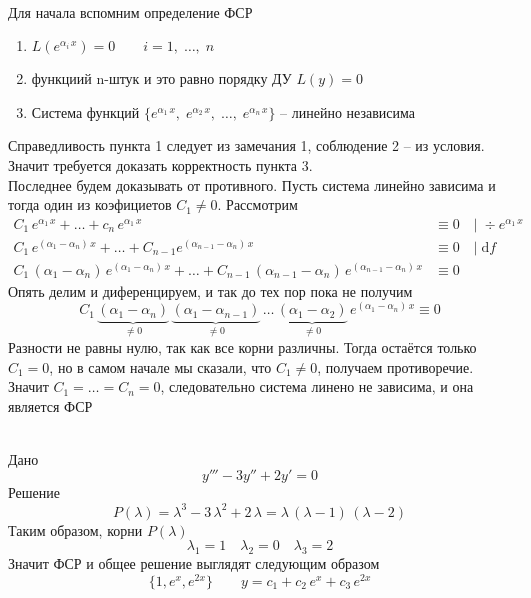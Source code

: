 \begin{Proof}~\\
    Для начала вспомним определение ФСР
    \begin{enumerate}
        \item $L(e^{\alpha_i\,x})=0 \qquad i=1,\; \dots,\; n$
        
        \item функциий n-штук и это равно порядку ДУ $L(y)=0$
        
        \item Система функций $\{e^{\alpha_1\,x},\; e^{\alpha_2\,x},\; \dots,\; e^{\alpha_n\,x}\}$ -- линейно независима
    \end{enumerate}
    
    Справедливость пункта 1 следует из замечания 1, соблюдение 2 -- из условия. Значит требуется доказать корректность пункта 3. \\
    
    Последнее будем доказывать от противного. Пусть система линейно зависима и тогда один из коэфициетов $C_1 \neq 0$. Рассмотрим
    \begin{align*}
        C_1\,e^{\alpha_1\,x} + \dots +c_n\,e^{\alpha_1\,x} &\equiv 0 \quad | \; \div e^{\alpha_1\,x}\\
        C_1\,e^{(\alpha_1-\alpha_n)\,x} + \dots + C_{n-1} e^{(\alpha_{n-1}-\alpha_n)\,x} &\equiv 0 \quad |\; \mathrm{d}f\\
        C_1\,(\alpha_1-\alpha_n)\,e^{(\alpha_1-\alpha_n)\,x} + \dots + C_{n-1}\,(\alpha_{n-1}-\alpha_n)\,e^{(\alpha_{n-1}-\alpha_n)\,x} &\equiv 0
    \end{align*}
    Опять делим и диференцируем, и так до тех пор пока не получим
    \[
        C_1\,\underbrace{(\alpha_1-\alpha_n)}_{\neq 0}\,\underbrace{(\alpha_1-\alpha_{n-1})}_{\neq 0}\,\dots\,\underbrace{(\alpha_1-\alpha_2)}_{\neq 0}\,e^{(\alpha_1-\alpha_n)\,x}\equiv 0
    \]
    Разности не равны нулю, так как все корни различны. Тогда остаётся только $C_1 = 0$, но в самом начале мы сказали, что $C_1 \neq 0$, получаем противоречие.\\
    
    Значит $C_1=\dots=C_n=0$, следовательно система линено не зависима, и она является ФСР
\end{Proof}

\begin{Example}~\\
    Дано
    \[
        y'''-3y''+2y'=0
    \]
    Решение
    \[
        P(\lambda)=\lambda^3-3\,\lambda^2+2\,\lambda=\lambda\,(\lambda-1)\,(\lambda-2)
    \]
    Таким образом, корни $P(\lambda)$
    \[
        \lambda_1=1 \quad \lambda_2=0 \quad \lambda_3=2  
    \]
    Значит ФСР и общее решение выглядят следующим образом
    \[
        \{1, e^x, e^{2x}\} \qquad y=c_1+c_2\,e^x+ c_3\,e^{2x}
    \]
\end{Example}

